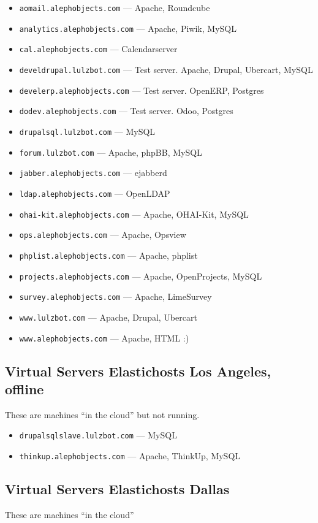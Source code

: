 \begin{itemize}
\item \texttt{aomail.alephobjects.com} --- Apache, Roundcube
\item \texttt{analytics.alephobjects.com}  --- Apache, Piwik, MySQL
\item \texttt{cal.alephobjects.com} --- Calendarserver
\item \texttt{develdrupal.lulzbot.com} --- Test server. Apache, Drupal,
       Ubercart, MySQL
\item \texttt{develerp.alephobjects.com} --- Test server. OpenERP, Postgres
\item \texttt{dodev.alephobjects.com} --- Test server. Odoo, Postgres
\item \texttt{drupalsql.lulzbot.com} --- MySQL
\item \texttt{forum.lulzbot.com} --- Apache, phpBB, MySQL
\item \texttt{jabber.alephobjects.com} --- ejabberd
\item \texttt{ldap.alephobjects.com} --- OpenLDAP
\item \texttt{ohai-kit.alephobjects.com} --- Apache, OHAI-Kit, MySQL
\item \texttt{ops.alephobjects.com} --- Apache, Opsview
\item \texttt{phplist.alephobjects.com} --- Apache, phplist
\item \texttt{projects.alephobjects.com} --- Apache, OpenProjects, MySQL
\item \texttt{survey.alephobjects.com} --- Apache, LimeSurvey
\item \texttt{www.lulzbot.com} --- Apache, Drupal, Ubercart
\item \texttt{www.alephobjects.com} --- Apache, HTML :)
\end{itemize}

\subsection{Virtual Servers Elastichosts Los Angeles, offline}
These are machines ``in the cloud'' but not running.

\begin{itemize}
\item \texttt{drupalsqlslave.lulzbot.com} --- MySQL
\item \texttt{thinkup.alephobjects.com} --- Apache, ThinkUp, MySQL
\end{itemize}

\subsection{Virtual Servers Elastichosts Dallas}
These are machines ``in the cloud''

